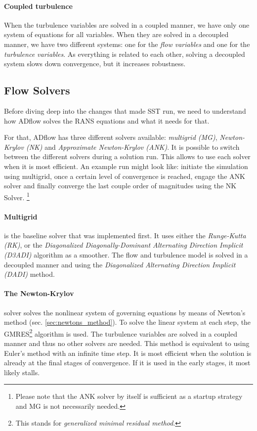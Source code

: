\paragraph{Coupled turbulence} When the turbulence variables are solved in a
coupled manner, we have only one system of equations for all variables. When
they are solved in a decoupled manner, we have two different systems: one for
the \textit{flow variables} and one for the \textit{turbulence variables}. As
everything is related to each other, solving a decoupled system slows down
convergence, but it increases robustness.




\subsection{Flow Solvers}
\label{sec:flow_solvers}
Before diving deep into the changes that made SST run, we need to understand
how ADflow solves the RANS equations and what it needs for that.

For that, ADflow has three different solvers available: \textit{multigrid
(MG)}, \textit{Newton-Krylov (NK)} and \textit{Approximate Newton-Krylov
(ANK)}. It is possible to switch between the different solvers during a
solution run. This allows to use each solver when it is most efficient. An
example run might look like: initiate the simulation using multigrid, once a
certain level of convergence is reached, engage the ANK solver and finally
converge the last couple order of magnitudes using the NK Solver.
\footnote{Please note that the ANK solver by itself is sufficient as a startup
strategy and MG is not necessarily needed.}

\paragraph{Multigrid} is the baseline solver that was implemented first. It
uses either the \textit{Runge-Kutta (RK)}, or the \textit{Diagonalized
Diagonally-Dominant Alternating Direction Implicit (D3ADI)} algorithm as a
smoother. The flow and turbulence model is solved in a decoupled manner and
using the \textit{Diagonalized Alternating Direction Implicit (DADI)} method.

\paragraph{The Newton-Krylov} solver solves the nonlinear system of governing
equations by means of Newton's method (sec. \ref{sec:newtons_method}). To solve
the linear system at each step, the GMRES\footnote{This stands for
\textit{generalized minimal residual method}.} algorithm is used. The
turbulence variables are solved in a coupled manner and thus no other solvers
are needed. This method is equivalent to using Euler's method with an infinite
time step. It is most efficient when the solution is already at the final
stages of convergence. If it is used in the early stages, it most likely
stalls.

